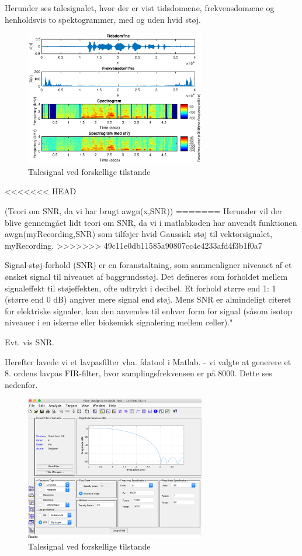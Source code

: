 \documentclass[a4paper]{report}
\begin{document}
Herunder ses talesignalet, hvor der er vist tidsdomæne, frekvensdomæne og henholdsvis to spektogrammer, med og uden hvid støj.

\begin{figure}[H] 
\centering
\includegraphics[width=0.7\textwidth]{grafer/White_noise_60}
\caption{Talesignal ved forskellige tilstande} \label{White_noise_60}
\end{figure}

<<<<<<< HEAD

(Teori om SNR, da vi har brugt awgn(x,SNR)) 
=======
Herunder vil der blive gennemgået lidt teori om SNR, da vi i matlabkoden har anvendt funktionen awgn(myRecording,SNR) som tilføjer hvid Gaussisk støj til vektorsignalet, myRecording. 
>>>>>>> 49c11e0db11585a90807cc4e4233afd4f3b1f0a7

Signal-støj-forhold (SNR) er en foranstaltning, som sammenligner niveauet af et ønsket signal til niveauet af baggrundsstøj. Det defineres som forholdet mellem signaleffekt til støjeffekten, ofte udtrykt i decibel. Et forhold større end 1: 1 (større end 0 dB) angiver mere signal end støj. Mens SNR er almindeligt citeret for elektriske signaler, kan den anvendes til enhver form for signal (såsom isotop niveauer i en iskerne eller biokemisk signalering mellem celler)."  

Evt. vis SNR. 


Herefter lavede vi et lavpasfilter vha. fdatool i Matlab. - vi valgte at generere et 8. ordens lavpas FIR-filter, hvor samplingsfrekvensen er på 8000. Dette ses nedenfor. 

\begin{figure}[H] 
\centering
\includegraphics[width=0.7\textwidth]{grafer/lavpasfilter}
\caption{Talesignal ved forskellige tilstande} \label{lavpasfilter}
\end{figure}
\end{document}

